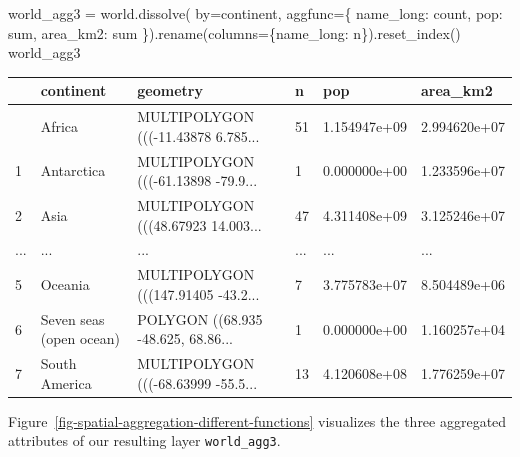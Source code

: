 \documentclass[
  letterpaper,
]{krantz}
\newenvironment{Shaded}{\begin{snugshade}}{\end{snugshade}}
\newcommand{\NormalTok}[1]{\textcolor[rgb]{0.00,0.23,0.31}{#1}}
\newcommand{\OperatorTok}[1]{\textcolor[rgb]{0.37,0.37,0.37}{#1}}
\newcommand{\StringTok}[1]{\textcolor[rgb]{0.13,0.47,0.30}{#1}}
\begin{document}
\begin{Shaded}
\begin{Highlighting}[]
\NormalTok{world\_agg3 }\OperatorTok{=}\NormalTok{ world.dissolve(}
\NormalTok{    by}\OperatorTok{=}\StringTok{\textquotesingle{}continent\textquotesingle{}}\NormalTok{, }
\NormalTok{    aggfunc}\OperatorTok{=}\NormalTok{\{}
        \StringTok{\textquotesingle{}name\_long\textquotesingle{}}\NormalTok{: }\StringTok{\textquotesingle{}count\textquotesingle{}}\NormalTok{,}
        \StringTok{\textquotesingle{}pop\textquotesingle{}}\NormalTok{: }\StringTok{\textquotesingle{}sum\textquotesingle{}}\NormalTok{,}
        \StringTok{\textquotesingle{}area\_km2\textquotesingle{}}\NormalTok{: }\StringTok{\textquotesingle{}sum\textquotesingle{}}
\NormalTok{    \}).rename(columns}\OperatorTok{=}\NormalTok{\{}\StringTok{\textquotesingle{}name\_long\textquotesingle{}}\NormalTok{: }\StringTok{\textquotesingle{}n\textquotesingle{}}\NormalTok{\}).reset\_index()}
\NormalTok{world\_agg3}
\end{Highlighting}
\end{Shaded}

\begin{longtable}[]{@{}llllll@{}}
\toprule\noalign{}
& continent & geometry & n & pop & area\_km2 \\
\midrule\noalign{}
\endhead
\bottomrule\noalign{}
\endlastfoot
0 & Africa & MULTIPOLYGON (((-11.43878 6.785... & 51 & 1.154947e+09 &
2.994620e+07 \\
1 & Antarctica & MULTIPOLYGON (((-61.13898 -79.9... & 1 & 0.000000e+00 &
1.233596e+07 \\
2 & Asia & MULTIPOLYGON (((48.67923 14.003... & 47 & 4.311408e+09 &
3.125246e+07 \\
... & ... & ... & ... & ... & ... \\
5 & Oceania & MULTIPOLYGON (((147.91405 -43.2... & 7 & 3.775783e+07 &
8.504489e+06 \\
6 & Seven seas (open ocean) & POLYGON ((68.935 -48.625, 68.86... & 1 &
0.000000e+00 & 1.160257e+04 \\
7 & South America & MULTIPOLYGON (((-68.63999 -55.5... & 13 &
4.120608e+08 & 1.776259e+07 \\
\end{longtable}

Figure~\ref{fig-spatial-aggregation-different-functions} visualizes the
three aggregated attributes of our resulting layer \texttt{world\_agg3}.
\end{document}
